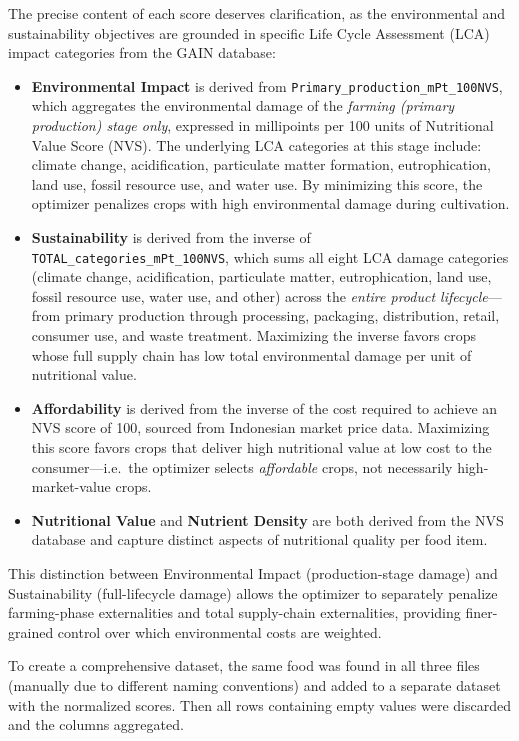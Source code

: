 \documentclass{oqireport}
\begin{document}
The precise content of each score deserves clarification, as the environmental and sustainability objectives are grounded in specific Life Cycle Assessment (LCA) impact categories from the GAIN database:
\begin{itemize}
    \item \textbf{Environmental Impact} is derived from \texttt{Primary\_production\_mPt\_100NVS}, which aggregates the environmental damage of the \textit{farming (primary production) stage only}, expressed in millipoints per 100 units of Nutritional Value Score (NVS). The underlying LCA categories at this stage include: climate change, acidification, particulate matter formation, eutrophication, land use, fossil resource use, and water use. By minimizing this score, the optimizer penalizes crops with high environmental damage during cultivation.
    \item \textbf{Sustainability} is derived from the inverse of \texttt{TOTAL\_categories\_mPt\_100NVS}, which sums all eight LCA damage categories (climate change, acidification, particulate matter, eutrophication, land use, fossil resource use, water use, and other) across the \textit{entire product lifecycle}---from primary production through processing, packaging, distribution, retail, consumer use, and waste treatment. Maximizing the inverse favors crops whose full supply chain has low total environmental damage per unit of nutritional value.
    \item \textbf{Affordability} is derived from the inverse of the cost required to achieve an NVS score of 100, sourced from Indonesian market price data. Maximizing this score favors crops that deliver high nutritional value at low cost to the consumer---i.e.\ the optimizer selects \textit{affordable} crops, not necessarily high-market-value crops.
    \item \textbf{Nutritional Value} and \textbf{Nutrient Density} are both derived from the NVS database and capture distinct aspects of nutritional quality per food item.
\end{itemize}

This distinction between Environmental Impact (production-stage damage) and Sustainability (full-lifecycle damage) allows the optimizer to separately penalize farming-phase externalities and total supply-chain externalities, providing finer-grained control over which environmental costs are weighted.

To create a comprehensive dataset, the same food was found in all three files (manually due to different naming conventions) and added to a separate dataset with the normalized scores. Then all rows containing empty values were discarded and the columns aggregated.
\end{document}
